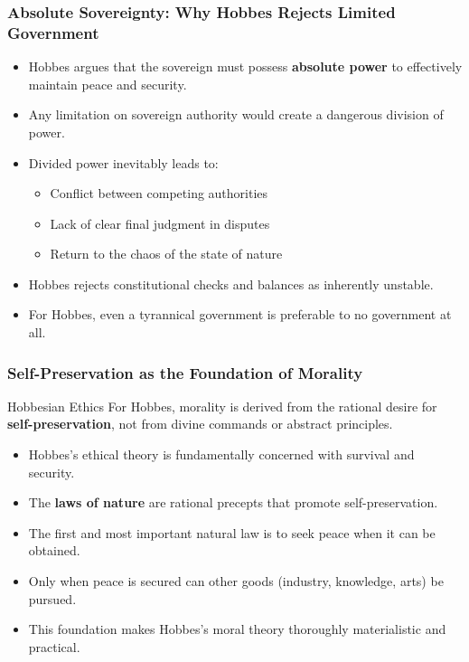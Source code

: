 \documentclass[aspectratio=169]{beamer}
\begin{document}
\begin{frame}
  \frametitle{Absolute Sovereignty: Why Hobbes Rejects Limited Government}
  
  \begin{itemize}
    \item Hobbes argues that the sovereign must possess \textbf{absolute power} to effectively maintain peace and security.
    \item Any limitation on sovereign authority would create a dangerous division of power.
    \item Divided power inevitably leads to:
      \begin{itemize}
        \item Conflict between competing authorities
        \item Lack of clear final judgment in disputes
        \item Return to the chaos of the state of nature
      \end{itemize}
    \item Hobbes rejects constitutional checks and balances as inherently unstable.
    \item For Hobbes, even a tyrannical government is preferable to no government at all.
  \end{itemize}
\end{frame}

\begin{frame}
  \frametitle{Self-Preservation as the Foundation of Morality}
  
  \begin{block}{Hobbesian Ethics}
    For Hobbes, morality is derived from the rational desire for \textbf{self-preservation}, not from divine commands or abstract principles.
  \end{block}
  
  \begin{itemize}
    \item Hobbes's ethical theory is fundamentally concerned with survival and security.
    \item The \textbf{laws of nature} are rational precepts that promote self-preservation.
    \item The first and most important natural law is to seek peace when it can be obtained.
    \item Only when peace is secured can other goods (industry, knowledge, arts) be pursued.
    \item This foundation makes Hobbes's moral theory thoroughly materialistic and practical.
  \end{itemize}
\end{frame}
\end{document}

